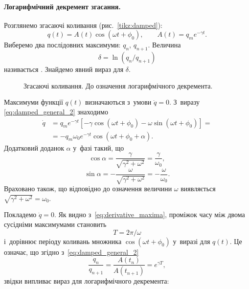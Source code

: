 \paragraph*{Логарифмічний декремент згасання.}
Розглянемо згасаючі коливання (рис.~\ref{tikz:damped}):
\begin{equation}\label{eq:damped_general_2}
	q(t) = A(t)\cos(\omega t + \phi_0), \qquad A(t) = q_m e^{-\gamma t}.
\end{equation}
Виберемо два послідовних максимуми: $q_n$, $q_{n+1}$. Величина
\begin{equation*}
	\delta = \ln(q_n / q_{n+1})
\end{equation*}
називається . Знайдемо явний вираз
для $\delta$.

\begin{figure}[h!]
	\centering
{}
	\caption{Згасаючі коливання. До означення логарифмічного декремента.}
	\label{tikz:log_decrement}
\end{figure}

Максимуми функції $q(t)$ визначаються з~умови $\dot{q} = 0$. З~виразу \eqref{eq:damped_general_2} знаходимо
\begin{equation}\label{eq:derivative_maxima}
	\begin{aligned}
		\dot{q} & = q_m e^{-\gamma t}\left[-\gamma \cos(\omega t + \phi_0) - \omega \sin(\omega t + \phi_0)\right] = \\
		        & = -q_m \omega_0 e^{-\gamma t} \cos(\omega t + \phi_0 + \alpha).
	\end{aligned}
\end{equation}
Додатковий доданок $\alpha$ у~фазі такий, що
\begin{equation*}
	\cos\alpha = \frac{\gamma}{\sqrt{\gamma^2 + \omega^2}} = \frac{\gamma}{\omega_0},
\end{equation*}
\begin{equation*}
	\sin\alpha = -\frac{\omega}{\sqrt{\gamma^2 + \omega^2}} = -\frac{\omega}{\omega_0}.
\end{equation*}
Враховано також, що відповідно до означення величини $\omega$ виявляється $\sqrt{\gamma^2 + \omega^2} = \omega_0$.

Покладемо $\dot{q} = 0$. Як видно з~\eqref{eq:derivative_maxima}, проміжок часу між
двома сусідніми максимумами становить
\begin{equation*}
	T = 2\pi/\omega
\end{equation*}
і~дорівнює періоду коливань множника $\cos(\omega t + \phi_0)$ у~виразі для
$q(t)$. Це означає, що згідно з~\eqref{eq:damped_general_2}
\begin{equation*}
	\frac{q_n}{q_{n+1}} = \frac{A(t_n)}{A(t_{n+1})} = e^{\gamma T},
\end{equation*}
звідки випливає вираз для логарифмічного декремента:

